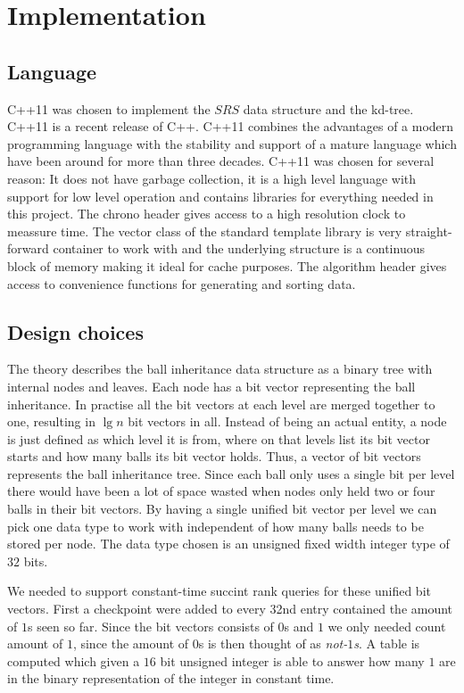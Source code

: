 \chapter{Implementation}

\section{Language}

C++11 was chosen to implement the $SRS$ data structure and the kd-tree. C++11 is a recent release of C++. C++11 combines the advantages of a modern programming language with the stability and support of a mature language which have been around for more than three decades. C++11 was chosen for several reason: It does not have garbage collection, it is a high level language with support for low level operation and contains libraries for everything needed in this project. The chrono header gives access to a high resolution clock to meassure time. The vector class of the standard template library is very straight-forward container to work with and the underlying structure is a continuous block of memory making it ideal for cache purposes. The algorithm header gives access to convenience functions for generating and sorting data.

\section{Design choices}

The theory describes the ball inheritance data structure as a binary tree with internal nodes and leaves. Each node has a bit vector representing the ball inheritance. In practise all the bit vectors at each level are merged together to one, resulting in $\lg n$ bit vectors in all. Instead of being an actual entity, a node is just defined as which level it is from, where on that levels list its bit vector starts and how many balls its bit vector holds. Thus, a vector of bit vectors represents the ball inheritance tree. Since each ball only uses a single bit per level there would have been a lot of space wasted when nodes only held two or four balls in their bit vectors. By having a single unified bit vector per level we can pick one data type to work with independent of how many balls needs to be stored per node. The data type chosen is an unsigned fixed width integer type of $32$ bits.

We needed to support constant-time succint rank queries for these unified bit vectors. First a checkpoint were added to every 32nd entry contained the amount of $1$s seen so far. Since the bit vectors consists of $0$s and $1$ we only needed count amount of $1$, since the amount of $0$s is then thought of as \emph{not-$1$s}. A table is computed which given a $16$ bit unsigned integer is able to answer how many $1$ are in the binary representation of the integer in constant time. 

